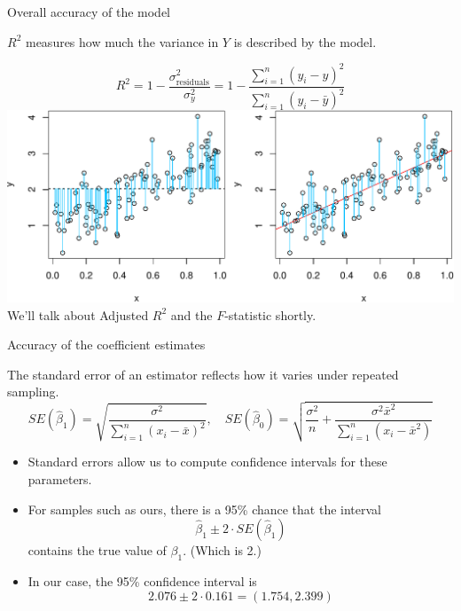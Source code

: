 \documentclass[
  ignorenonframetext,
]{beamer}
\providecommand{\tightlist}{%
  \setlength{\itemsep}{0pt}\setlength{\parskip}{0pt}}
\begin{document}
\begin{frame}{Overall accuracy of the model}
\protect\hypertarget{overall-accuracy-of-the-model}{}

\(R^2\) measures how much the variance in \(Y\) is described by the
model.

\[
R^2 = 1 - \frac{\sigma_\text{residuals}^2}{\sigma_y^2} = 1 - \frac{\sum_{i=1}^n(y_i-\hat y)^2}{\sum_{i=1}^n(y_i-\bar y)^2}
\]
\includegraphics{Regression_and_ANOVA_files/figure-beamer/unnamed-chunk-6-1.pdf}
We'll talk about Adjusted \(R^2\) and the \(F\)-statistic shortly.

\end{frame}

\begin{frame}{Accuracy of the coefficient estimates}
\protect\hypertarget{accuracy-of-the-coefficient-estimates}{}

The standard error of an estimator reflects how it varies under repeated
sampling. \[
SE(\hat\beta_1)=\sqrt{\frac{\sigma^2}{\sum_{i=1}^n(x_i-\bar x)^2}}, \quad SE(\hat\beta_0)=\sqrt{\frac{\sigma^2}{n}+\frac{\sigma^2\bar x^2}{\sum_{i=1}^n(x_i-\bar x^2)}}
\]

\begin{itemize}
\tightlist
\item
  Standard errors allow us to compute confidence intervals for these
  parameters.
\item
  For samples such as ours, there is a 95\% chance that the interval \[
  \hat\beta_1 \pm 2 \cdot SE(\hat\beta_1)
  \] contains the true value of \(\beta_1\). (Which is 2.)
\item
  In our case, the 95\% confidence interval is \[
  2.076 \pm 2 \cdot 0.161 = (1.754,2.399)
  \]
\end{itemize}

\end{frame}
\end{document}
